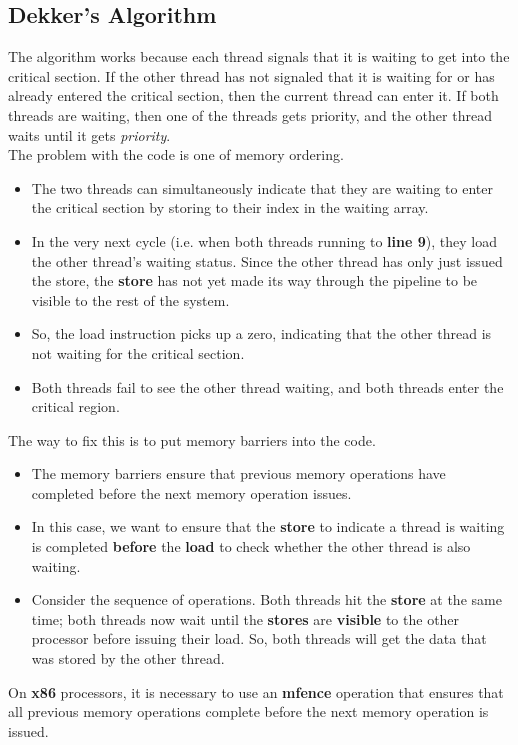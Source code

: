 \documentclass[12pt,a4paper]{report}
\begin{document}
\subsection{Dekker's Algorithm}
The algorithm works because each thread signals that it is waiting to get into the critical section. If the other thread has not signaled that it is waiting for or has already entered the critical section, then the current thread can enter it. If both threads are waiting, then one of the threads gets priority, and the other thread waits until it gets \textit{priority}.
\\
The problem with the code is one of memory ordering.
\begin{itemize}
	\item The two threads can simultaneously indicate that they are waiting to enter the critical section by storing to their index in the waiting array.
	\item In the very next cycle (i.e. when both threads running to \textbf{line 9}), they load the other thread's waiting status. Since the other thread has only just issued the store, the \textbf{store} has not yet made its way through the pipeline to be visible to the rest of the system.
	\item So, the load instruction picks up a zero, indicating that the other thread is not waiting for the critical section. 
	\item Both threads fail to see the other thread waiting, and both threads enter the critical region.
\end{itemize}
The way to fix this is to put memory barriers into the code.
\begin{itemize}
	\item The memory barriers ensure that previous memory operations have completed before the next memory operation issues.
	\item In this case, we want to ensure that the \textbf{store} to indicate a thread is waiting is completed \textbf{before} the \textbf{load} to check whether the other thread is also waiting.
	\item Consider the sequence of operations. Both threads hit the \textbf{store} at the same time; both threads now wait until the \textbf{stores} are \textbf{visible} to the other processor before issuing their load. So, both threads will get the data that was stored by the other thread.
\end{itemize}
On \textbf{x86} processors, it is necessary to use an \textbf{mfence} operation that ensures that all previous memory operations complete before the next memory operation is issued.
\end{document}
